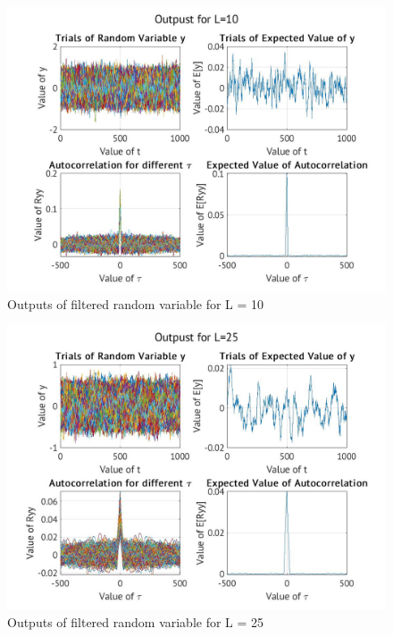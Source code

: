 \documentclass[a4paper, 11pt]{article}
\begin{document}
\begin{figure}[htbp]
\centering
\includegraphics[width=.9\linewidth]{./Images/L10.jpg}
\caption{\label{fig:L10}Outputs of filtered random variable for L = 10}
\end{figure}

\begin{figure}[htbp]
\centering
\includegraphics[width=.9\linewidth]{./Images/L25.jpg}
\caption{\label{fig:L25}Outputs of filtered random variable for L = 25}
\end{figure}
\end{document}
